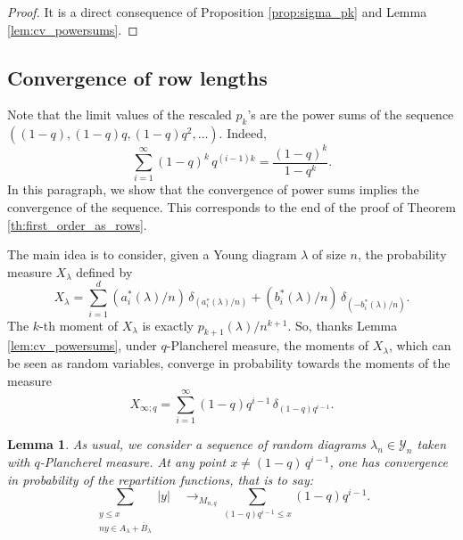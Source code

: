 \documentclass[10pt]{amsart}
\newtheorem{lemma}[theorem]{Lemma}
\theoremstyle{remark}
\newcommand{\young}{\mathscr{Y}}
\begin{document}
\begin{proof}
It is a direct consequence of Proposition \ref{prop:sigma_pk} and Lemma \ref{lem:cv_powersums}.
\end{proof}\bigskip




\subsection{Convergence of row lengths} \label{subsect:convergence_rows}
 Note that the limit values of the rescaled $p_k$'s are the power sums of the sequence $((1-q),(1-q)q,(1-q)q^2,\ldots)$. Indeed,
$$\sum_{i=1}^\infty (1-q)^k\, q^{(i-1)k}=\frac{(1-q)^k}{1-q^k}.$$
In this paragraph, we show that the convergence of power sums implies the convergence of the sequence. This corresponds to the end of the proof of Theorem \ref{th:first_order_as_rows}. \bigskip

The main idea is to consider, given a Young diagram $\lambda$ of size $n$, the probability measure $X_\lambda$ defined by
$$X_\lambda=\sum_{i=1}^d (a_i^*(\lambda)/n)\,\delta_{(a_i^*(\lambda)/n)}+(b_i^*(\lambda)/n)\,\delta_{(-b_i^*(\lambda)/n)}.$$
The $k$-th moment of $X_\lambda$ is exactly $p_{k+1}(\lambda)/n^{k+1}$. So, thanks Lemma \ref{lem:cv_powersums}, under $q$-Plancherel measure, the moments of $X_\lambda$, which can be seen as random variables, converge in probability towards the moments of the measure
$$ X_{\infty;q}=\sum_{i=1}^\infty (1-q)q^{i-1}\,\delta_{(1-q)q^{i-1}}. $$
\begin{lemma}\label{lem:cv_fct_repartition}
As usual, we consider a sequence of random diagrams $\lambda_n \in \young_n$ taken with $q$-Plancherel measure. At any point $x \neq (1-q)\,q^{i-1}$, one has convergence in probability of the repartition functions, that is to say:
$$\sum_{\substack{y\leq x\\ ny \in A_\lambda+\overline{B}_\lambda}} \!\!\!\!|y|\quad \longrightarrow_{M_{n,q}} \sum_{(1-q)q^{i-1} \leq x} \!\!\!\!(1-q)q^{i-1}.$$
\end{lemma}
 
\end{document}
